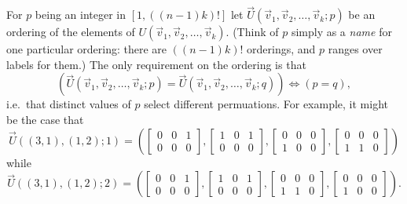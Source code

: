 \label{def:ordering}For $p$ being an integer in $[1,((n-1)k)!]$ let $\vec U(\vec v_1, \vec v_2, \ldots, \vec v_k; p)$ be an ordering of the elements of $U(\vec v_1, \vec v_2, \ldots, \vec v_k)$.  (Think of $p$ simply as a \emph{name} for one particular ordering: there are $((n-1)k)!$ orderings, and $p$ ranges over labels for them.)  The only requirement on the ordering is that $$\left( 
\vec U(\vec v_1, \vec v_2, \ldots, \vec v_k; p) = 
\vec U(\vec v_1, \vec v_2, \ldots, \vec v_k; q) \right)
\iff
\left( p=q \right),
$$
i.e.~that distinct values of $p$ select different permuations.
%
For example, it might be the case that 
$$\vec U((3,1), (1,2); 1) = \left(
\begin{bmatrix}
0 & 0 & 1 \\
0 & 0 & 0
\end{bmatrix},
\begin{bmatrix}
1 & 0 & 1 \\
0 & 0 & 0
\end{bmatrix},
\begin{bmatrix}
0 & 0 & 0 \\
1 & 0 & 0
\end{bmatrix},
\begin{bmatrix}
0 & 0 & 0 \\
1 & 1 & 0 
\end{bmatrix}
\right)$$
while
$$\vec U((3,1), (1,2); 2) = \left(
\begin{bmatrix}
0 & 0 & 1 \\
0 & 0 & 0
\end{bmatrix},
\begin{bmatrix}
1 & 0 & 1 \\
0 & 0 & 0
\end{bmatrix},
\begin{bmatrix}
0 & 0 & 0 \\
1 & 1 & 0 
\end{bmatrix},
\begin{bmatrix}
0 & 0 & 0 \\
1 & 0 & 0
\end{bmatrix}
\right).$$


